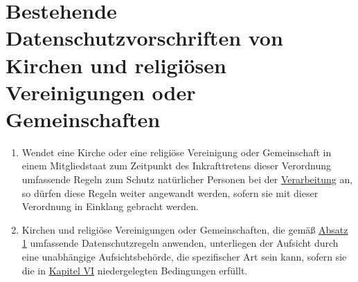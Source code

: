 \chapter{Bestehende Datenschutzvorschriften von Kirchen und religiösen Vereinigungen oder Gemeinschaften}
\label{ch:91}


\begin{enumerate}

  \item Wendet eine Kirche oder eine religiöse Vereinigung oder Gemeinschaft in einem Mitgliedstaat zum Zeitpunkt des
   Inkrafttretens dieser Verordnung umfassende Regeln zum Schutz natürlicher Personen bei der \hyperref[itm:04-2]{Verarbeitung} an, so
   dürfen diese Regeln weiter angewandt werden, sofern sie mit dieser Verordnung in Einklang gebracht werden.
  \label{itm:91-1}

  \item Kirchen und religiöse Vereinigungen oder Gemeinschaften, die gemäß \hyperref[itm:91-1]{Absatz 1} umfassende
   Datenschutzregeln anwenden, unterliegen der Aufsicht durch eine unabhängige Aufsichtsbehörde, die spezifischer Art
   sein kann, sofern sie die in \hyperref[part:6]{Kapitel VI} niedergelegten Bedingungen erfüllt.
  \label{itm:91-2}
   
\end{enumerate}


